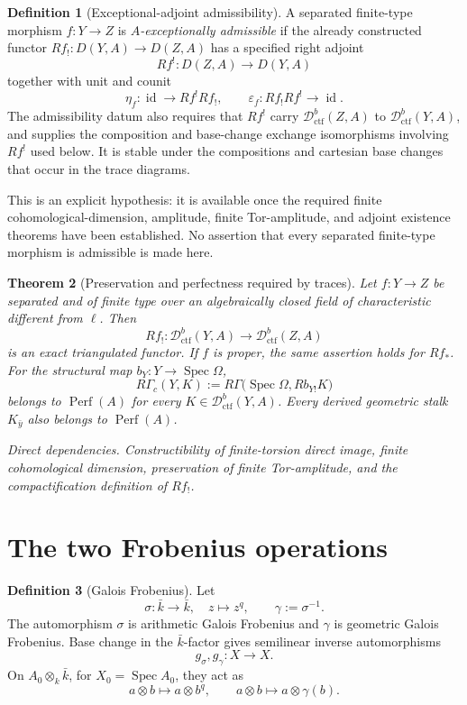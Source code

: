\documentclass[10pt]{article}
\newtheorem{theorem}{Theorem}[section]
\theoremstyle{definition}
\newtheorem{definition}[theorem]{Definition}
\newcommand{\Dctf}{\mathcal D^b_{\mathrm{ctf}}}
\newcommand{\Perf}{\operatorname{Perf}}
\newcommand{\Spec}{\operatorname{Spec}}
\newcommand{\RGammac}{R\Gamma_c}
\newcommand{\depends}[1]{\par\smallskip\noindent\textit{Direct dependencies.} #1\par}
\begin{document}
\begin{definition}[Exceptional-adjoint admissibility]
A separated finite-type morphism \(f:Y\to Z\) is
\emph{\(A\)-exceptionally admissible} if the already constructed functor
\(Rf_!:D(Y,A)\to D(Z,A)\) has a specified right adjoint
\[
 Rf^!:D(Z,A)\longrightarrow D(Y,A)
\]
together with unit and counit
\[
 \eta_f:\operatorname{id}\to Rf^!Rf_!,
 \qquad
 \varepsilon_f:Rf_!Rf^!\to\operatorname{id}.
\]
The admissibility datum also requires that \(Rf^!\) carry \(\Dctf(Z,A)\)
to \(\Dctf(Y,A)\), and supplies the composition and base-change exchange
isomorphisms involving \(Rf^!\) used below.  It is stable under the
compositions and cartesian base changes that occur in the trace diagrams.

This is an explicit hypothesis: it is available once the required finite
cohomological-dimension, amplitude, finite Tor-amplitude, and adjoint
existence theorems have been established.  No assertion that every
separated finite-type morphism is admissible is made here.
\end{definition}

\begin{theorem}[Preservation and perfectness required by traces]
Let \(f:Y\to Z\) be separated and of finite type over an algebraically
closed field of characteristic different from \(\ell\).  Then
\[
 Rf_!:\Dctf(Y,A)\longrightarrow\Dctf(Z,A)
\]
is an exact triangulated functor.  If \(f\) is proper, the same assertion
holds for \(Rf_*\).  For the structural map \(b_Y:Y\to\Spec\Omega\),
\[
 \RGammac(Y,K):=R\Gamma\bigl(\Spec\Omega,Rb_{Y!}K\bigr)
\]
belongs to \(\Perf(A)\) for every \(K\in\Dctf(Y,A)\).  Every derived
geometric stalk \(K_{\bar y}\) also belongs to \(\Perf(A)\).
\depends{Constructibility of finite-torsion direct image, finite
cohomological dimension, preservation of finite Tor-amplitude, and the
compactification definition of \(Rf_!\).}
\end{theorem}

\section{The two Frobenius operations}

\begin{definition}[Galois Frobenius]
Let
\[
 \sigma:\bar k\to\bar k,\quad z\mapsto z^q,
 \qquad \gamma:=\sigma^{-1}.
\]
The automorphism \(\sigma\) is arithmetic Galois Frobenius and \(\gamma\)
is geometric Galois Frobenius.  Base change in the \(\bar k\)-factor gives
semilinear inverse automorphisms
\[
 g_\sigma,g_\gamma:X\longrightarrow X.
\]
On \(A_0\otimes_k\bar k\), for \(X_0=\Spec A_0\), they act as
\[
 a\otimes b\mapsto a\otimes b^q,
 \qquad
 a\otimes b\mapsto a\otimes\gamma(b).
\]
\end{definition}
\end{document}
